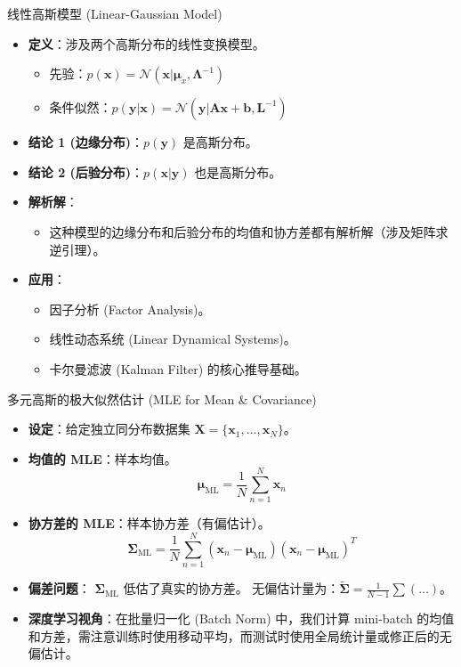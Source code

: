 \documentclass[12pt, aspectratio=169]{beamer}
\newcommand{\vect}[1]{\mathbf{#1}}
\newcommand{\mat}[1]{\mathbf{#1}}
\newcommand{\N}{\mathcal{N}}
\begin{document}
\begin{frame}{线性高斯模型 (Linear-Gaussian Model)}
    \begin{itemize}
        \item \textbf{定义}：涉及两个高斯分布的线性变换模型。
        \begin{itemize}
            \item 先验：$p(\vect{x}) = \N(\vect{x}|\boldsymbol{\mu}_x, \boldsymbol{\Lambda}^{-1})$
            \item 条件似然：$p(\vect{y}|\vect{x}) = \N(\vect{y}|\mat{A}\vect{x}+\vect{b}, \mat{L}^{-1})$
        \end{itemize}
        \item \textbf{结论 1 (边缘分布)}：$p(\vect{y})$ 是高斯分布。
        \item \textbf{结论 2 (后验分布)}：$p(\vect{x}|\vect{y})$ 也是高斯分布。
        \item \textbf{解析解}：
        \begin{itemize}
            \item 这种模型的边缘分布和后验分布的均值和协方差都有解析解（涉及矩阵求逆引理）。
        \end{itemize}
        \item \textbf{应用}：
        \begin{itemize}
            \item 因子分析 (Factor Analysis)。
            \item 线性动态系统 (Linear Dynamical Systems)。
            \item 卡尔曼滤波 (Kalman Filter) 的核心推导基础。
        \end{itemize}
    \end{itemize}
\end{frame}

\begin{frame}{多元高斯的极大似然估计 (MLE for Mean \& Covariance)}
    \begin{itemize}
        \item \textbf{设定}：给定独立同分布数据集 $\mat{X} = \{\vect{x}_1, \dots, \vect{x}_N\}$。
        \item \textbf{均值的 MLE}：样本均值。
        $$ \boldsymbol{\mu}_{\text{ML}} = \frac{1}{N} \sum_{n=1}^N \vect{x}_n $$
        \item \textbf{协方差的 MLE}：样本协方差（有偏估计）。
        $$ \boldsymbol{\Sigma}_{\text{ML}} = \frac{1}{N} \sum_{n=1}^N (\vect{x}_n - \boldsymbol{\mu}_{\text{ML}})(\vect{x}_n - \boldsymbol{\mu}_{\text{ML}})^T $$
        \item \textbf{偏差问题}：
        $\boldsymbol{\Sigma}_{\text{ML}}$ 低估了真实的协方差。
        无偏估计量为：$\tilde{\boldsymbol{\Sigma}} = \frac{1}{N-1} \sum (\dots)$。
        \item \textbf{深度学习视角}：在批量归一化 (Batch Norm) 中，我们计算 mini-batch 的均值和方差，需注意训练时使用移动平均，而测试时使用全局统计量或修正后的无偏估计。
    \end{itemize}
\end{frame}
\end{document}
